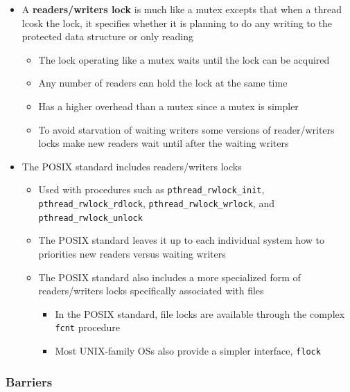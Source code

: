 \documentclass[11pt]{article}
\providecommand{\tightlist}{%
      \setlength{\itemsep}{0pt}\setlength{\parskip}{0pt}}
\begin{document}
\begin{itemize}
\tightlist
\item
  A \textbf{readers/writers lock} is much like a mutex excepts that when
  a thread lcosk the lock, it specifies whether it is planning to do any
  writing to the protected data structure or only reading

  \begin{itemize}
  \tightlist
  \item
    The lock operating like a mutex waits until the lock can be acquired
  \item
    Any number of readers can hold the lock at the same time
  \item
    Has a higher overhead than a mutex since a mutex is simpler
  \item
    To avoid starvation of waiting writers some versions of
    reader/writers locks make new readers wait until after the waiting
    writers
  \end{itemize}
\item
  The POSIX standard includes readers/writers locks

  \begin{itemize}
  \tightlist
  \item
    Used with procedures such as \texttt{pthread\_rwlock\_init},
    \texttt{pthread\_rwlock\_rdlock}, \texttt{pthread\_rwlock\_wrlock},
    and \texttt{pthread\_rwlock\_unlock}
  \item
    The POSIX standard leaves it up to each individual system how to
    priorities new readers versus waiting writers
  \item
    The POSIX standard also includes a more specialized form of
    readers/writers locks specifically associated with files

    \begin{itemize}
    \tightlist
    \item
      In the POSIX standard, file locks are available through the
      complex \texttt{fcnt} procedure
    \item
      Most UNIX-family OSs also provide a simpler interface,
      \texttt{flock}
    \end{itemize}
  \end{itemize}
\end{itemize}

    \subsubsection{Barriers}\label{barriers}
\end{document}
